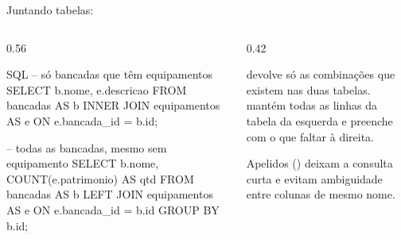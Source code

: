 \documentclass[aspectratio=169,10pt]{beamer}
\begin{document}
\begin{frame}[fragile]{Juntando tabelas: }
  \begin{columns}[T]
    \begin{column}{0.56\textwidth}
\begin{codigo}[title=INNER e LEFT JOIN]{SQL}
-- só bancadas que têm equipamentos
SELECT b.nome, e.descricao
FROM   bancadas AS b
INNER  JOIN equipamentos AS e
       ON e.bancada_id = b.id;

-- todas as bancadas, mesmo sem equipamento
SELECT b.nome, COUNT(e.patrimonio) AS qtd
FROM   bancadas AS b
LEFT   JOIN equipamentos AS e
       ON e.bancada_id = b.id
GROUP  BY b.id;
\end{codigo}
    \end{column}
    \begin{column}{0.42\textwidth}
      \centering
      \begin{conceito}[Diferença]
         devolve só as combinações que existem nas duas tabelas.  mantém todas as linhas da tabela da esquerda e preenche com  o que faltar à direita.
      \end{conceito}
      \begin{dica}
        Apelidos () deixam a consulta curta e evitam ambiguidade entre colunas de mesmo nome.
      \end{dica}
    \end{column}
  \end{columns}
\end{frame}
\end{document}
